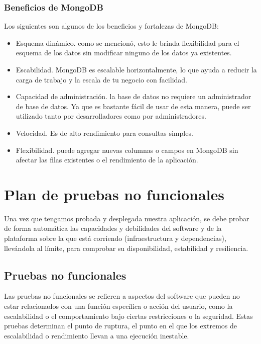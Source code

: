 \subsubsection{Beneficios de MongoDB}

Los siguientes son algunos de los beneficios y fortalezas de MongoDB:

\begin{itemize}
  \item Esquema dinámico. como se mencionó, esto le brinda flexibilidad para el esquema de los datos sin modificar ninguno de los datos ya existentes.
  \item Escabilidad. MongoDB es escalable horizontalmente, lo que ayuda a reducir la carga de trabajo y la escala de tu negocio con facilidad.
  \item Capacidad de administración. la base de datos no requiere un administrador de base de datos. Ya que es bastante fácil de usar de esta manera, puede ser utilizado tanto por desarrolladores como por administradores.
  \item Velocidad. Es de alto rendimiento para consultas simples.
  \item Flexibilidad. puede agregar nuevas columnas o campos en MongoDB sin afectar las filas existentes o el rendimiento de la aplicación.
\end{itemize}

\section{Plan de pruebas no funcionales}

Una vez que tengamos probada y desplegada nuestra aplicación, se debe probar de forma automática las capacidades y debilidades del software y de la plataforma sobre la que está corriendo (infraestructura y dependencias), llevándola al límite, para comprobar su disponibilidad, estabilidad y resiliencia.

\subsection{Pruebas no funcionales}

Las pruebas no funcionales se refieren a aspectos del software que pueden no estar relacionados con una función específica o acción del usuario, como la escalabilidad o el comportamiento bajo ciertas restricciones o la seguridad. Estas pruebas determinan el punto de ruptura, el punto en el que los extremos de escalabilidad o rendimiento llevan a una ejecución inestable.

